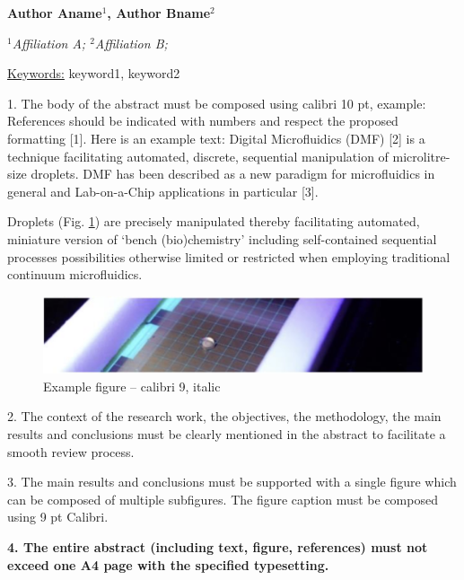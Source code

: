 \documentclass{article}
\newcommand{\abstracttitle}[1]{
\begin{center}{
    \textcolor{titlecolor}{\fontsize{15pt}{16pt}{\textbf{#1}}}
    }\vspace{0pt}
\end{center}}
\newcommand{\authors}[1]{
\begin{center}{
    \fontsize{11pt}{12pt}\textbf{#1}
    }\vspace{-8pt}
\end{center}}
\newcommand{\affiliation}[1]{
\begin{center}{
    \fontsize{11pt}{12pt}\textit{#1}
    }\vspace{-8pt}
\end{center}}
\newcommand{\auth}[2][1]{#2$^{#1}$}
\newcommand{\affi}[2][1]{$^{#1}$#2}
\newcommand{\keywords}[1]{{
    \small{\underline{Keywords:} #1}
    }
    \vspace{4pt}
}
\begin{document}
\abstracttitle{Title Calibri, 16 pt, bold, (R=60 G=100 B=100)}
\authors{
    \auth[1]{Author Aname}, 
    \auth[2]{Author Bname}
}

\affiliation{
    \affi[1]{Affiliation A}; 
    \affi[2]{Affiliation B};
}

\keywords{keyword1, keyword2}


1. The body of the abstract must be composed using calibri 10 pt, example: References should be indicated with numbers and respect the proposed formatting [1]. Here is an example text: Digital Microfluidics (DMF) [2] is a technique facilitating automated, discrete, sequential manipulation of microlitre-size droplets. DMF has been described as a new paradigm for microfluidics in general and Lab-on-a-Chip applications in particular [3].

Droplets (Fig. \ref{fig:main_figure}) are precisely manipulated thereby facilitating automated, miniature version of ‘bench (bio)chemistry’ including self-contained sequential processes possibilities otherwise limited or restricted when employing traditional continuum microfluidics.

\begin{figure}[h!]
\centering
  \includegraphics[width=\linewidth]{main_figure.png}
  \caption{
    Example figure – calibri 9, italic
  }
\label{fig:main_figure}
\end{figure}

2. The context of the research work, the objectives, the methodology, the main results and conclusions must be clearly mentioned in the abstract to facilitate a smooth review process.

3. The main results and conclusions must be supported with a single figure which can be composed of multiple subfigures. The figure caption must be composed using {\small 9 pt Calibri}.

\textbf{4. The entire abstract (including text, figure, references) must not exceed one A4 page with the specified typesetting.}
\end{document}
